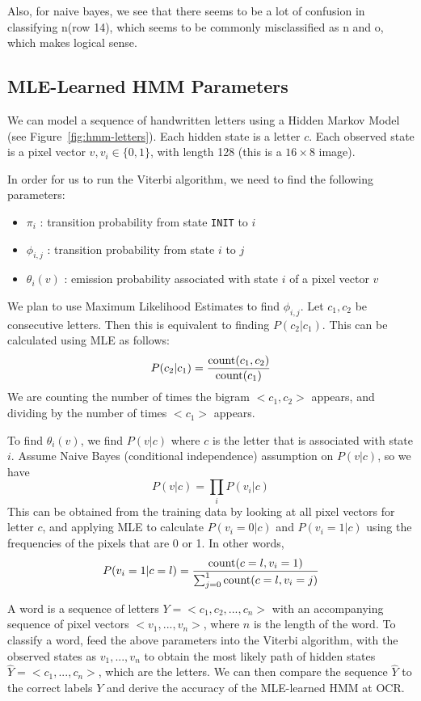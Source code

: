 \documentclass{article} %
\begin{document}
Also, for naive bayes, we see that there seems to be a lot of confusion in classifying n(row 14), which seems to be commonly misclassified as n and o, which makes logical sense. 


\subsection{MLE-Learned HMM Parameters}

We can model a sequence of handwritten letters using a Hidden Markov Model (see Figure~\ref{fig:hmm-letters}). Each hidden state is a letter $c$. Each observed state is a pixel vector $v, v_i \in \{0,1\}$, with length 128 (this is a $16 \times 8$ image). 

In order for us to run the Viterbi algorithm, we need to find the following parameters:
\begin{itemize}
	\item $\pi_i$ : transition probability from state \texttt{INIT} to $i$
	\item $\phi_{i,j}$ : transition probability from state $i$ to $j$
	\item $\theta_{i}(v)$ : emission probability associated with state $i$ of a pixel vector $v$
\end{itemize}

We plan to use Maximum Likelihood Estimates to find $\phi_{i,j}$. Let $c_1, c_2$ be consecutive letters. Then this is equivalent to finding $P(c_2 | c_1)$. This can be calculated using MLE as follows:
$$ P(c_2 | c_1) = \frac{\mbox{count}(c_1, c_2)}{\mbox{count}(c_1)}$$
We are counting the number of times the bigram $<c_1, c_2>$ appears, and dividing by the number of times $<c_1>$ appears.

To find $\theta_{i}(v)$, we find $P(v | c)$ where $c$ is the letter that is associated with state $i$. Assume Naive Bayes (conditional independence) assumption on $P(v | c)$, so we have 
$$ P(v | c) = \prod_i P(v_i | c)$$
This can be obtained from the training data by looking at all pixel vectors for letter $c$, and applying MLE to calculate $P(v_i = 0 | c)$ and $P(v_i = 1 | c)$ using the frequencies of the pixels that are 0 or 1. In other words,
$$ P(v_i = 1 | c = l) = \frac{\mbox{count}(c = l, v_i = 1)}{\sum_{j=0}^1 \mbox{count}(c = l, v_i = j)}$$

A word is a sequence of letters $Y = <c_1, c_2, ..., c_n>$ with an accompanying sequence of pixel vectors $<v_1, ..., v_n>$, where $n$ is the length of the word. To classify a word, feed the above parameters into the Viterbi algorithm, with the observed states as $v_1, ..., v_n$ to obtain the most likely path of hidden states $\hat{Y} = <c_1, ..., c_n>$, which are the letters. We can then compare the sequence $\hat{Y}$ to the correct labels $Y$ and derive the accuracy of the MLE-learned HMM at OCR.
\end{document}
